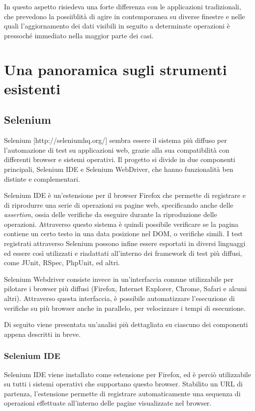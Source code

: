 \documentclass[12pt]{toptesi}
\begin{document}
In questo aspetto risiedeva una forte differenza con le applicazioni tradizionali, che prevedono la possiiblità di agire in contemporanea su diverse finestre e nelle quali l'aggiornamento dei dati visibili in seguito a determinate operazioni è pressoché immediato nella maggior parte dei casi.


\chapter{Una panoramica sugli strumenti esistenti}

\section{Selenium}

Selenium [http://seleniumhq.org/]  sembra essere il sistema più diffuso per l'automazione di test su applicazioni web, grazie alla sua compatibilità con differenti browser e sistemi operativi.
Il progetto si divide in due componenti principali, Selenium IDE e Selenium WebDriver, che hanno funzionalità ben distinte e complementari. 

Selenium IDE è un'estensione per il browser Firefox che permette di registrare e di riprodurre una serie di operazioni su pagine web, specificando anche delle \emph{assertion}, ossia delle verifiche da eseguire durante la riproduzione delle operazioni. Attraverso questo sistema è quindi possibile verificare se la pagina contiene un certo testo in una data posizione nel DOM, o verifiche simili. I test registrati attraverso Selenium possono infine essere esportati in diversi linguaggi ed essere così utilizzati e riadattati all'interno dei framework di test più diffusi, come JUnit, RSpec, PhpUnit, ed altri.

Selenium Webdriver consiste invece in un'interfaccia comune utilizzabile per pilotare i browser più diffusi (Firefox, Internet Explorer, Chrome, Safari e alcuni altri). Attraverso questa interfaccia, è possibile automatizzare l'esecuzione di verifiche su più browser anche in parallelo, per velocizzare i tempi di esecuzione.

Di seguito viene presentata un'analisi più dettagliata su ciascuno dei componenti appena descritti in breve.

\subsection{Selenium IDE}

Selenium IDE viene installato come estensione per Firefox,  ed è perciò utilizzabile su tutti i sistemi operativi che supportano questo browser. Stabilito un URL di partenza, l'estensione permette di registrare automaticamente una sequenza di operazioni effettuate all'interno delle pagine visualizzate nel browser. 
\end{document}
